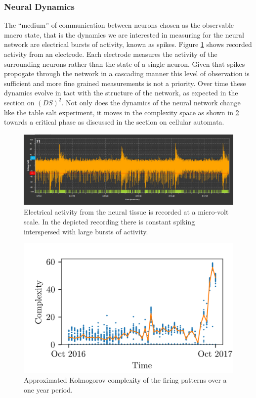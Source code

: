 \subsubsection{Neural Dynamics}
The ``medium'' of communication between neurons chosen as the observable macro
state, that is the dynamics we are interested in measuring for the neural
network are electrical bursts of activity, known as spikes.
Figure \ref{figWave} shows recorded activity from an electrode.
Each electrode measures the activity of the surrounding neurons rather than the
state of a single neuron.
Given that spikes propogate through the network in a cascading manner this
level of observation is sufficient and more fine grained measurements is not a
priority.
Over time these dynamics evolve in tact with the structure of the network, as
expected in the section on $(DS)^2$.
Not only does the dynamics of the neural network change like the table salt
experiment, it moves in the complexity space as shown in \ref{figDopey} towards
a critical phase as discussed in the section on cellular automata.
%
\begin{figure}[h]
  \centering
  \includegraphics[width=1\textwidth]{fig/PacemakerBurst.png}
  \caption{
    Electrical activity from the neural tissue is recorded at a micro-volt
    scale.
    In the depicted recording there is constant spiking interspersed with large
    bursts of activity.
  }
  \label{figWave}
\end{figure}
\begin{figure}[h]
  \centering
  \includegraphics[width=1\textwidth]{fig/dopeyComplexity.png}
  \caption{
    Approximated Kolmogorov complexity of the firing patterns over a one year
    period.
  }
  \label{figDopey}
\end{figure}
